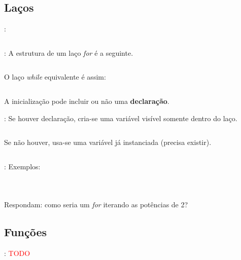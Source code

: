 \subsection{Laços}


\begin{frame}{\insertsection: \insertsubsection}
  \inputminted[firstline=1,lastline=3]{arduino}{sketches/introLinguagem/.while.ino}
\end{frame}


\begin{frame}{\insertsection: \insertsubsection}
  A estrutura de um laço \textit{for} é a seguinte.
  \inputminted[firstline=01,lastline=03]{arduino}{sketches/introLinguagem/.for.ino}

  O laço \textit{while} equivalente é assim:
  \inputminted[firstline=05,lastline=10]{arduino}{sketches/introLinguagem/.while.ino}

  A inicialização pode incluir ou não uma \textbf{declaração}.
\end{frame}


\begin{frame}{\insertsection: \insertsubsection}
  Se houver declaração, cria-se uma variável visível somente dentro do laço.
  \inputminted[firstline=05,lastline=07]{arduino}{sketches/introLinguagem/.for.ino}

  Se não houver, usa-se uma variável já instanciada (precisa existir).
  \inputminted[firstline=09,lastline=14]{arduino}{sketches/introLinguagem/.for.ino}
\end{frame}


\begin{frame}{\insertsection: \insertsubsection}
  Exemplos:
  \begin{columns}
    \inputminted[firstline=16,lastline=18]{arduino}{sketches/introLinguagem/.for.ino}
    \inputminted[firstline=20,lastline=22]{arduino}{sketches/introLinguagem/.for.ino}
  \end{columns}
  Respondam: como seria um \textit{for} iterando as potências de 2?
\end{frame}


\subsection{Funções}


\begin{frame}{\insertsection: \insertsubsection}
  \textcolor{red}{TODO}
\end{frame}
